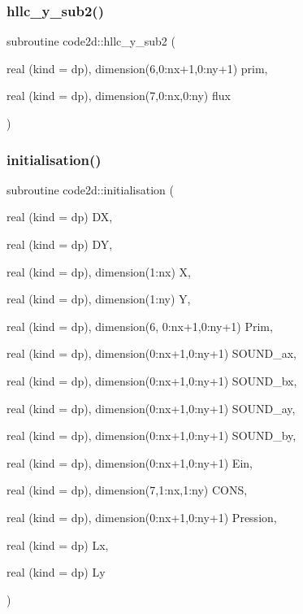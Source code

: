 \mbox{\label{main2Dv1_8f90_a66b4ae2bdd9b70fca9079c3827fa8c30}} 
\subsubsection{\texorpdfstring{hllc\+\_\+y\+\_\+sub2()}{hllc\_y\_sub2()}}
{\footnotesize\ttfamily subroutine code2d\+::hllc\+\_\+y\+\_\+sub2 (\begin{DoxyParamCaption}\item[{real (kind = dp), dimension(6,0\+:nx+1,0\+:ny+1)}]{prim,  }\item[{real (kind = dp), dimension(7,0\+:nx,0\+:ny)}]{flux }\end{DoxyParamCaption})}

\mbox{\label{main2Dv1_8f90_a5305b00a3d0d3ea8f4a992aa2547b701}} 
\subsubsection{\texorpdfstring{initialisation()}{initialisation()}}
{\footnotesize\ttfamily subroutine code2d\+::initialisation (\begin{DoxyParamCaption}\item[{real (kind = dp)}]{DX,  }\item[{real (kind = dp)}]{DY,  }\item[{real (kind = dp), dimension(1\+:nx)}]{X,  }\item[{real (kind = dp), dimension(1\+:ny)}]{Y,  }\item[{real (kind = dp), dimension(6, 0\+:nx+1,0\+:ny+1)}]{Prim,  }\item[{real (kind = dp), dimension(0\+:nx+1,0\+:ny+1)}]{S\+O\+U\+N\+D\+\_\+ax,  }\item[{real (kind = dp), dimension(0\+:nx+1,0\+:ny+1)}]{S\+O\+U\+N\+D\+\_\+bx,  }\item[{real (kind = dp), dimension(0\+:nx+1,0\+:ny+1)}]{S\+O\+U\+N\+D\+\_\+ay,  }\item[{real (kind = dp), dimension(0\+:nx+1,0\+:ny+1)}]{S\+O\+U\+N\+D\+\_\+by,  }\item[{real (kind = dp), dimension(0\+:nx+1,0\+:ny+1)}]{Ein,  }\item[{real (kind = dp), dimension(7,1\+:nx,1\+:ny)}]{C\+O\+NS,  }\item[{real (kind = dp), dimension(0\+:nx+1,0\+:ny+1)}]{Pression,  }\item[{real (kind = dp)}]{Lx,  }\item[{real (kind = dp)}]{Ly }\end{DoxyParamCaption})}

